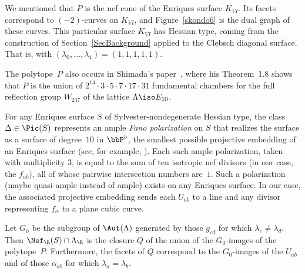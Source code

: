 \begin{rema}\label{RkPolytopeRemarks}
We mentioned that $P$ is the nef cone of the Enriques surface $K_{VI}$. Its facets correspond to $(-2)$-curves on $K_{VI}$, and Figure~\ref{skondo6} is the dual graph of these curves. This particular surface $K_{VI}$ has Hessian type, coming from the construction of Section~\ref{SecBackground} applied to the Clebsch diagonal surface. That is, with $(\lambda_0,\ldots,\lambda_4) = (1,1,1,1,1)$.

The polytope~$P$ also occurs in Shimada's paper~\cite{Shimada}, where his Theorem~1.8 shows that $P$ is the union of $2^{14}\cdot 3\cdot 5\cdot 7\cdot 17\cdot 31$ fundamental chambers for the full reflection group $W_{237}$ of the lattice $\Lambda\iso E_{10}$.

For any Enriques surface $S$ of Sylvester-nondegenerate Hessian type, the class $\Delta\in\Pic(S)$ represents an ample \emph{Fano polarization} on $S$ that realizes the surface as a surface of degree~$10$ in $\bbP^5$, the smallest possible projective embedding of an Enriques surface (see, for example, \cite[p.~14]{DolgachevBrief}). Each such ample polarization, taken with multiplicity $3$, is equal to the sum of ten isotropic nef divisors (in our case, the $f_{ab}$), all of whose pairwise intersection numbers are~$1$. Such a  polarization (maybe quasi-ample instead of ample) exists on any Enriques surface. In our case, the associated projective embedding sends each $U_{ab}$ to a line and any divisor representing $f_{\alpha}$ to a plane cubic curve.
\end{rema}

\begin{theo}\label{Thmnefcone}
Let $G_0$ be the subgroup of $\Aut(\Lambda)$ generated by those $g_{cd}$ for which $\lambda_c\neq\lambda_d$. Then $\Nef_\R(S)\cap\Lambda_\R$ is the closure $Q$ of the union of the $G_0$-images of the polytope~$P$. Furthermore, the facets of $Q$ correspond to the $G_0$-images of the $U_{ab}$ and of those $\alpha_{ab}$ for which $\lambda_a=\lambda_b$.
\end{theo}


